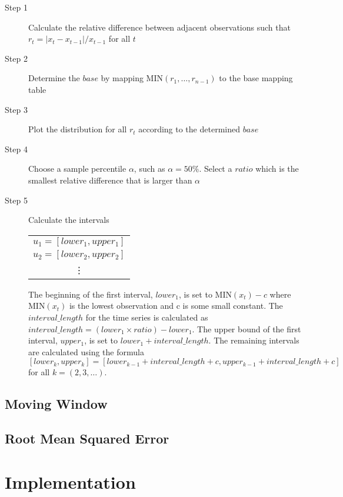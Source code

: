 \documentclass{article}
\theoremstyle{definition}
\begin{document}
\begin{description}
\item[Step 1] Calculate the relative difference between adjacent observations such that $r_t=|x_t-x_{t-1}|/x_{t-1}$ for all $t$
\item[Step 2] Determine the $base$ by mapping MIN$(r_1,\ldots,r_{n-1})$ to the base mapping table
\item[Step 3] Plot the distribution for all $r_t$ according to the determined $base$
\item[Step 4] Choose a sample percentile $\alpha$, such as $\alpha=50\%$. Select a $ratio$ which is the smallest relative difference that is larger than $\alpha$
\item[Step 5] Calculate the intervals 

\begin{table}[H]
	\center
	\begin{tabular}{ c }
	  	$u_1 = [lower_1, upper_1]$ \\
	  	$u_2 = [lower_2, upper_2]$ \\
	  	\vdots \\
	\end{tabular}
\end{table}

The beginning of the first interval, $lower_1$, is set to MIN$(x_t)-c$ where MIN$(x_t)$ is the lowest observation and c is some small constant. The $interval\_length$ for the time series is calculated as $interval\_length=(lower_1 \times ratio) - lower_1$. The upper bound of the first interval, $upper_1$, is set to $lower_1 + interval\_length$. The remaining intervals are calculated using the formula $[lower_k,upper_k]=[lower_{k-1}+interval\_length+c, upper_{k-1}+interval\_length+c]$ for all $k=(2,3,\ldots)$.
\end{description}

\subsection{Moving Window}

\subsection{Root Mean Squared Error}

\label{rmse}

\section{Implementation}
\end{document}

